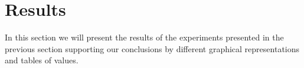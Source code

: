 \section{Results} \label{sec:results}
In this section we will present the results of the experiments presented in the previous section supporting our conclusions by different graphical representations and tables of values.